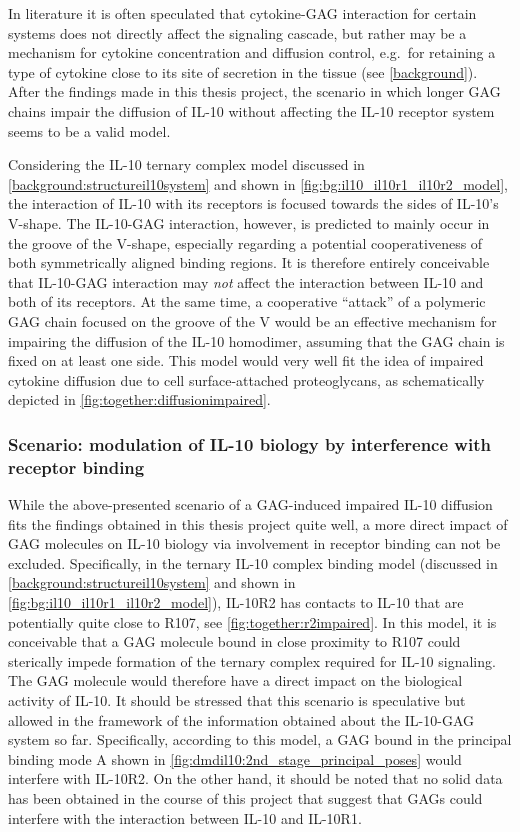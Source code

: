 In literature it is often speculated that cytokine-GAG interaction for certain
systems does not directly affect the signaling cascade, but rather may be a
mechanism for cytokine concentration and diffusion control, e.g.\ for retaining
a type of cytokine close to its site of secretion in the tissue (see
\cref{background}). After the findings made in this thesis project, the scenario
in which longer GAG chains impair the diffusion of IL-10 without affecting the
IL-10 receptor system seems to be a valid model.

Considering the IL-10 ternary complex model discussed in
\cref{background:structureil10system} and shown in
\cref{fig:bg:il10_il10r1_il10r2_model}, the interaction of IL-10 with its
receptors is focused towards the sides of IL-10's V-shape. The IL-10-GAG
interaction, however, is predicted to mainly occur in the groove of the V-shape,
especially regarding a potential cooperativeness of both symmetrically aligned
binding regions. It is therefore entirely conceivable that IL-10-GAG interaction
may \textit{not} affect the interaction between IL-10 and both of its
receptors. At the same time, a cooperative \enquote{attack} of a polymeric GAG
chain focused on the groove of the V would be an effective mechanism for
impairing the diffusion of the IL-10 homodimer, assuming that the GAG chain is
fixed on at least one side. This model would very well fit the idea of impaired
cytokine diffusion due to cell surface-attached proteoglycans, as schematically
depicted in \cref{fig:together:diffusionimpaired}.


\subsubsection{Scenario: modulation of IL-10 biology by interference with
receptor binding}

While the above-presented scenario of a GAG-induced impaired IL-10 diffusion
fits the findings obtained in this thesis project quite well, a more direct
impact of GAG molecules on IL-10 biology via involvement in receptor binding can
not be excluded. Specifically, in the ternary IL-10 complex binding model
(discussed in \cref{background:structureil10system} and shown in
\cref{fig:bg:il10_il10r1_il10r2_model}), IL-10R2 has contacts to IL-10 that are
potentially quite close to R107, see \cref{fig:together:r2impaired}. In this
model, it is conceivable that a GAG molecule bound in close proximity to R107
could sterically impede formation of the ternary complex required for IL-10
signaling. The GAG molecule would therefore have a direct impact on the
biological activity of IL-10. It should be stressed that this scenario is
speculative but allowed in the framework of the information obtained about the
IL-10-GAG system so far. Specifically, according to this model, a GAG bound in
the principal binding mode A shown in
\cref{fig:dmdil10:2nd_stage_principal_poses} would interfere with IL-10R2. On
the other hand, it should be noted that no solid data has been obtained in the
course of this project that suggest that GAGs could interfere with the
interaction between IL-10 and IL-10R1.

